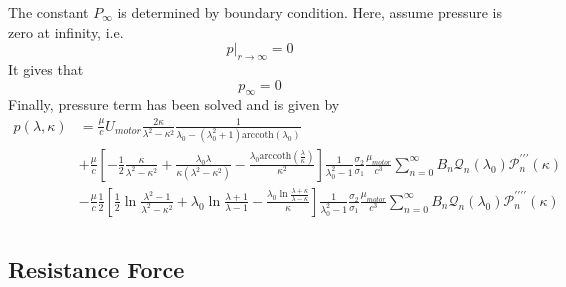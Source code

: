 \documentclass[fontsize=11pt, %
                             paper=a4, %
                             twoside, %
                             captions=tableheading,
                             index=totoc,
                             hyperref]{labbook}
\begin{document}
The constant $P_\infty$ is determined by boundary condition. Here, assume pressure is zero at infinity, i.e.
\begin{equation}
p|_{r\to\infty}=0
\end{equation}
It gives that
\begin{equation}
p_\infty=0
\end{equation}
Finally, pressure term has been solved and is given by
\begin{equation}
\begin{aligned}
p(\lambda,\kappa)&=\frac{\mu}{c}U_{motor}\frac{2\kappa}{\lambda^2-\kappa^2}\frac{1}{\lambda_0-(\lambda_0^2+1)\mathrm{arccoth}(\lambda_0)}\\
&+\frac{\mu}{c}
\left[-\frac{1}{2}\frac{\kappa}{\lambda^2-\kappa^2}+\frac{\lambda_0\lambda}{\kappa(\lambda^2-\kappa^2)}-\frac{\lambda_0\mathrm{arccoth}(\frac{\lambda}{\kappa})}{\kappa^2}\right]
\frac{1}{\lambda_0^2-1}\frac{\sigma_2}{\sigma_1}\frac{\mu_{motor}}{c^3}\sum_{n=0}^\infty B_n \mathscr{Q}_n(\lambda_0)\mathscr{P}_n^{\prime\prime\prime}(\kappa)\\
&-\frac{\mu}{c}\frac{1}{2}
\left[\frac{1}{2}\ln \frac{\lambda^2-1}{\lambda^2-\kappa^2}+\lambda_0\ln\frac{\lambda+1}{\lambda-1}-\frac{\lambda_0\ln\frac{\lambda+\kappa}{\lambda-\kappa}}{\kappa}\right]
\frac{1}{\lambda_0^2-1}\frac{\sigma_2}{\sigma_1}\frac{\mu_{motor}}{c^3}\sum_{n=0}^\infty B_n \mathscr{Q}_n(\lambda_0)\mathscr{P}_n^{\prime\prime\prime\prime}(\kappa)\\
\end{aligned}
\end{equation}
\subsection{Resistance Force}
\end{document}
